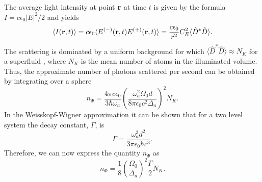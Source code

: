 The average light intensity at point $\mathbf{r}$ at time $t$ is given
by the formula $I = c \epsilon_0 |E|^2/2$ and yields
\begin{equation}
  \langle I (\mathbf{r}, t) \rangle = c \epsilon_0 \langle
  E^{(-)} (\mathbf{r}, t) E^{(+)} (\mathbf{r}, t) \rangle =
  \frac{c \epsilon_0}{r^2} C_E^2 \langle \hat{D}^* \hat{D} \rangle.
\end{equation}
The scattering is dominated by a uniform background for which $\langle
\hat{D}^* \hat{D} \rangle \approx N_K$ for a superfluid
\cite{mekhov2012}, where $N_K$ is the mean number of atoms in the
illuminated volume. Thus, the approximate number of photons scattered
per second can be obtained by integrating over a sphere
\begin{equation}
  n_{\Phi} = \frac{4 \pi c \epsilon_0}{3 \hbar \omega_a} \left(\frac{\omega_a^2
      \Omega_0 d}{8 \pi \epsilon_0 c^2 \Delta_a}\right)^2 N_K.
\end{equation}
In the Weisskopf-Wigner approximation it can be shown \cite{Scully}
that for a two level system the decay constant, $\Gamma$, is
\begin{equation}
  \Gamma = \frac{\omega_a^3 d^2}{3 \pi \epsilon_0 \hbar c^3}.
\end{equation}
Therefore, we can now express the quantity $n_{\Phi}$ as
\begin{equation}
  n_{\Phi} = \frac{1}{8} \left(\frac{\Omega_0}{\Delta_a}\right)^2 \frac{\Gamma}{2} N_K.
\end{equation}

